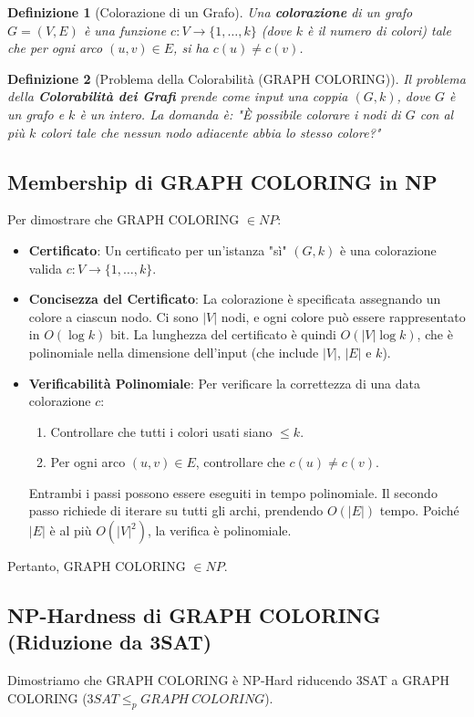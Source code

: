 \documentclass[a4paper]{article}
\newtheorem{definition}{Definizione}
\begin{document}
\begin{definition}[Colorazione di un Grafo]
Una \textbf{colorazione} di un grafo $G=(V, E)$ è una funzione $c: V \to \{1, \dots, k\}$ (dove $k$ è il numero di colori) tale che per ogni arco $(u, v) \in E$, si ha $c(u) \ne c(v)$.
\end{definition}

\begin{definition}[Problema della Colorabilità (GRAPH COLORING)]
Il problema della \textbf{Colorabilità dei Grafi} prende come input una coppia $(G, k)$, dove $G$ è un grafo e $k$ è un intero.
La domanda è: "È possibile colorare i nodi di $G$ con \emph{al più} $k$ colori tale che nessun nodo adiacente abbia lo stesso colore?"
\end{definition}

\subsection{Membership di GRAPH COLORING in NP}
Per dimostrare che GRAPH COLORING $\in NP$:
\begin{itemize}
    \item \textbf{Certificato}: Un certificato per un'istanza "sì" $(G, k)$ è una colorazione valida $c: V \to \{1, \dots, k\}$.
    \item \textbf{Concisezza del Certificato}: La colorazione è specificata assegnando un colore a ciascun nodo. Ci sono $|V|$ nodi, e ogni colore può essere rappresentato in $O(\log k)$ bit. La lunghezza del certificato è quindi $O(|V| \log k)$, che è polinomiale nella dimensione dell'input (che include $|V|$, $|E|$ e $k$).
    \item \textbf{Verificabilità Polinomiale}: Per verificare la correttezza di una data colorazione $c$:
        \begin{enumerate}
            \item Controllare che tutti i colori usati siano $\le k$.
            \item Per ogni arco $(u, v) \in E$, controllare che $c(u) \ne c(v)$.
        \end{enumerate}
    Entrambi i passi possono essere eseguiti in tempo polinomiale. Il secondo passo richiede di iterare su tutti gli archi, prendendo $O(|E|)$ tempo. Poiché $|E|$ è al più $O(|V|^2)$, la verifica è polinomiale.
\end{itemize}
Pertanto, GRAPH COLORING $\in NP$.

\subsection{NP-Hardness di GRAPH COLORING (Riduzione da 3SAT)}
Dimostriamo che GRAPH COLORING è NP-Hard riducendo 3SAT a GRAPH COLORING ($3SAT \le_p GRAPH\ COLORING$).
\end{document}
